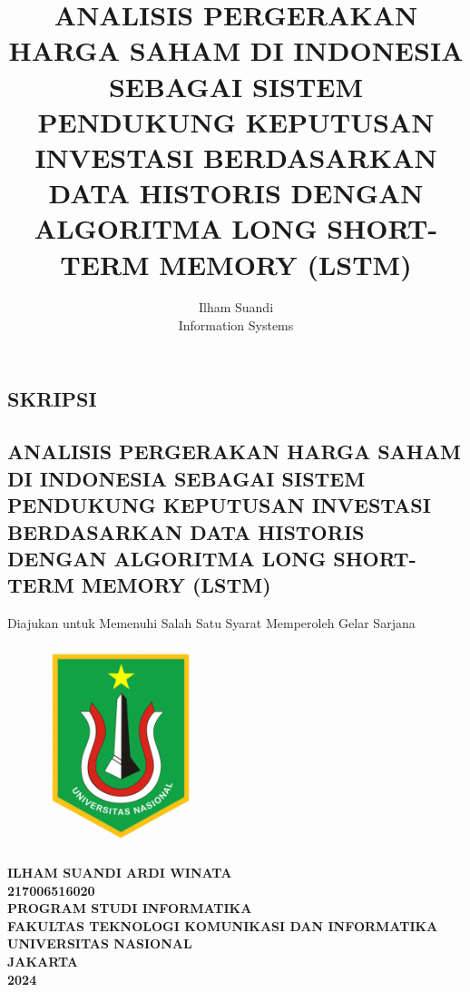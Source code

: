 \documentclass[12pt]{report}
\title{ANALISIS PERGERAKAN HARGA SAHAM DI INDONESIA SEBAGAI SISTEM PENDUKUNG KEPUTUSAN INVESTASI BERDASARKAN DATA HISTORIS DENGAN ALGORITMA LONG SHORT-TERM MEMORY (LSTM)}
\author{Ilham Suandi \\ Information Systems}
\date{}
\begin{document}
\setlength{\emergencystretch}{5em}

\onehalfspacing
\frenchspacing

\setlength{\parindent}{1cm}

\begin{titlepage}
	\thispagestyle{empty}
	\pagestyle{empty}
	\titleformat{\chapter}[hang]{\fontsize{14}{14}\centering\bfseries}{\thechapter}{}{}
	\titleformat{\section}[hang]{\fontsize{14}{14}\bfseries\centering}{\textbf{\thesection}}{1pc}{}
	\centering
	\chapter*{SKRIPSI}
	\section*{ANALISIS PERGERAKAN HARGA SAHAM DI INDONESIA SEBAGAI SISTEM PENDUKUNG KEPUTUSAN INVESTASI BERDASARKAN DATA HISTORIS DENGAN ALGORITMA LONG SHORT-TERM MEMORY (LSTM)}
	\vspace{2cm}
	Diajukan untuk Memenuhi Salah Satu Syarat Memperoleh Gelar Sarjana
	\begin{figure}[H]
		\centering
		\includegraphics[width=0.4\textwidth]{logo_unas.png}
	\end{figure}
	\textbf{ILHAM SUANDI ARDI WINATA} \\
	\textbf{217006516020} \\
	\vfill
	{\fontsize{14}{16}\selectfont \textbf{PROGRAM STUDI INFORMATIKA}} \\
	{\fontsize{13}{16}\selectfont \textbf{FAKULTAS TEKNOLOGI KOMUNIKASI DAN INFORMATIKA}} \\
	{\fontsize{13}{16}\selectfont \textbf{UNIVERSITAS NASIONAL}} \\
	{\fontsize{13}{16}\selectfont \textbf{JAKARTA}} \\
	{\fontsize{13}{16}\selectfont \textbf{2024}}
\end{titlepage}
\end{document}
